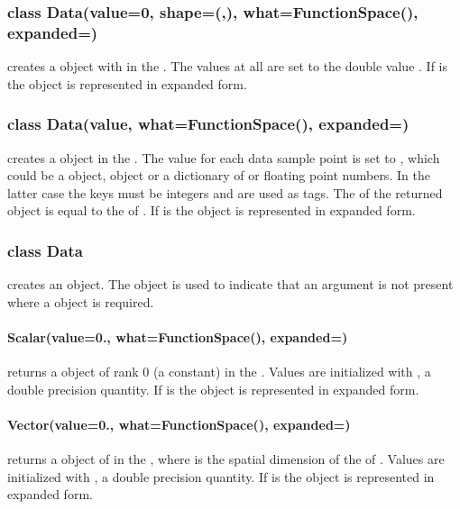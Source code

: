\subsubsection*{class Data(value=0, shape=(,), what=FunctionSpace(), expanded=\False)}
creates a \Data object with \Shape {} in the \FunctionSpace {}.
The values at all \DataSamplePoints are set to the double value .
If  is \True the \Data object is represented in expanded form.


\subsubsection*{class Data(value, what=FunctionSpace(), expanded=\False)}
creates a \Data object in the \FunctionSpace {}.
The value for each data sample point is set to , which could be a
\numpy object, \Data object or a dictionary of \numpy or floating point
numbers. In the latter case the keys must be integers and are used as tags.
The \Shape of the returned object is equal to the \Shape of .
If  is \True the \Data object is represented in expanded form.


\subsubsection*{class Data}
creates an \EmptyData object. The \EmptyData object is used to indicate that
an argument is not present where a \Data object is required.


\paragraph{Scalar(value=0., what=FunctionSpace(), expanded=\False)}
returns a \Data object of rank 0 (a constant) in the \FunctionSpace {}.
Values are initialized with , a double precision quantity.
If  is \True the \Data object is represented in expanded form.


\paragraph{Vector(value=0., what=FunctionSpace(), expanded=\False)}
returns a \Data object of \Shape {} in the \FunctionSpace {},
where  is the spatial dimension of the \Domain of .
Values are initialized with , a double precision quantity.
If  is \True the \Data object is represented in expanded form.


